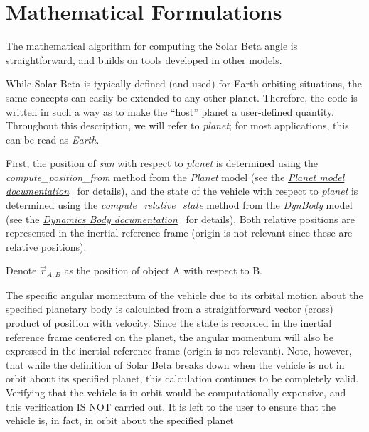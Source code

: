 %
%
% 
%

\section{Mathematical Formulations}\label{sec:solarbetamath}

The mathematical algorithm for computing the Solar Beta angle is straightforward, and builds on tools developed in other models.

While Solar Beta is typically defined (and used) for Earth-orbiting situations, the same concepts can easily be extended to any other planet.  Therefore, the code is written in such a way as to make the ``host'' planet a user-defined quantity.  Throughout this description, we will refer to \textit{planet}; for most applications, this can be read as \textit{Earth}.  

First, the position of \textit{sun} with respect to \textit{planet} is determined using the \textit{compute\_position\_from} method from the \textit{Planet} model (see the \href{file:\JEODHOME/models/environment/planet/docs/planet.pdf}{\em Planet model documentation}~\cite{dynenv:PLANET} for details), and the state of the vehicle with respect to \textit{planet} is determined using the \textit{compute\_relative\_state} method from the \textit{DynBody} model (see the \href{file:\JEODHOME/models/dynamics/dyn_body/docs/dyn_body.pdf}{\em Dynamics Body documentation}~\cite{dynenv:DYNBODY} for details).  Both relative positions are represented in the inertial reference frame (origin is not relevant since these are relative positions).

Denote $\vec {r}_{A,B}$ as the position of object A with respect to B.

The specific angular momentum of the vehicle due to its orbital motion about the specified planetary body is calculated from a straightforward vector (cross) product of position with velocity.  Since the state is recorded in the inertial reference frame centered on the planet, the angular momentum will also be expressed in the inertial reference frame (origin is not relevant).  Note, however, that while the definition of Solar Beta breaks down when the vehicle is not in orbit about its specified planet, this calculation continues to be completely valid.  Verifying that the vehicle is in orbit would be computationally expensive, and this verification IS NOT carried out.  It is left to the user to ensure that the vehicle is, in fact, in orbit about the specified planet

